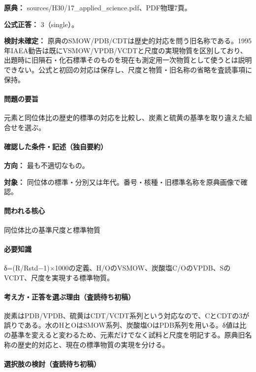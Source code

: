 \noindent\textbf{原典：} sources/H30/17\_applied\_science.pdf、PDF物理7頁。

\textbf{公式正答：} 3（single）。

\par\textbf{検討未確定：} 原典のSMOW/PDB/CDTは歴史的対応を問う旧名称である。1995年IAEA勧告は既にVSMOW/VPDB/VCDTと尺度の実現物質を区別しており、出題時に旧隕石・化石標準そのものを現在も測定用一次物質として使うとは説明できない。公式と初回の対応は保存し、尺度と物質・旧名称の省略を査読事項に保持。

\paragraph{問題の要旨} 元素と同位体比の歴史的標準の対応を比較し、炭素と硫黄の基準を取り違えた組合せを選ぶ。

\paragraph{確認した条件・記述（独自要約）}\mbox{}\par

\noindent\textbf{方向：} 最も不適切なもの。\par

\noindent\textbf{対象：} 同位体の標準・分別又は年代。番号・核種・旧標準名称を原典画像で確認。\par

\paragraph{問われる核心} 同位体比の基準尺度と標準物質

\paragraph{必要知識} δ=(R/Rstd−1)×1000の定義、H/OのVSMOW、炭酸塩C/OのVPDB、SのVCDT、尺度を実現する標準物質。

\paragraph{考え方・正答を選ぶ理由（査読待ち初稿）} 炭素はPDB/VPDB、硫黄はCDT/VCDT系列という対応なので、CとCDTの3が誤りである。水のHとOはSMOW系列、炭酸塩OはPDB系列を用いる。δ値は比の基準を変えると変わるため、元素だけでなく試料と尺度を明記する。原典旧名称の歴史的対応と、現在の標準物質の実現を分ける。

\paragraph{選択肢の検討（査読待ち初稿）}\mbox{}\par

